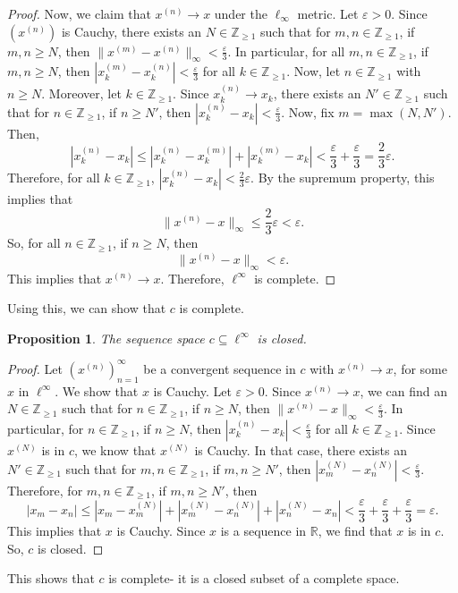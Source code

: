 \documentclass[a4paper, openany]{memoir}
\theoremstyle{definition}
\theoremstyle{plain}
\newtheorem{proposition}[definition]{Proposition}
\begin{document}
\begin{proof}
    \noindent Now, we claim that $x^{(n)} \to x$ under the $\ell_\infty$ metric. Let $\varepsilon > 0$. Since $(x^{(n)})$ is Cauchy, there exists an $N \in \mathbb{Z}_{\geq 1}$ such that for $m, n \in \mathbb{Z}_{\geq 1}$, if $m, n \geq N$, then $\lVert x^{(m)} - x^{(n)} \rVert_\infty < \frac{\varepsilon}{3}$. In particular, for all $m, n \in \mathbb{Z}_{\geq 1}$, if $m, n \geq N$, then $|x^{(m)}_k - x^{(n)}_k| < \frac{\varepsilon}{3}$ for all $k \in \mathbb{Z}_{\geq 1}$. Now, let $n \in \mathbb{Z}_{\geq 1}$ with $n \geq N$. Moreover, let $k \in \mathbb{Z}_{\geq 1}$. Since $x_k^{(n)} \to x_k$, there exists an $N' \in \mathbb{Z}_{\geq 1}$ such that for $n \in \mathbb{Z}_{\geq 1}$, if $n \geq N'$, then $|x_k^{(n)} - x_k| < \frac{\varepsilon}{3}$. Now, fix $m = \max(N, N')$. Then, 
    \[|x_k^{(n)} - x_k| \leq |x_k^{(n)} - x_k^{(m)}| + |x_k^{(m)} - x_k| < \frac{\varepsilon}{3} + \frac{\varepsilon}{3} = \frac{2}{3}\varepsilon.\]
    Therefore, for all $k \in \mathbb{Z}_{\geq 1}$, $|x_k^{(n)} - x_k| < \frac{2}{3}\varepsilon$. By the supremum property, this implies that
    \[\lVert x^{(n)} - x \rVert_\infty \leq \frac{2}{3}\varepsilon < \varepsilon.\]
    So, for all $n \in \mathbb{Z}_{\geq 1}$, if $n \geq N$, then
    \[\lVert x^{(n)} - x \rVert_\infty < \varepsilon.\]
    This implies that $x^{(n)} \to x$. Therefore, $\ell^\infty$ is complete.
\end{proof}
\noindent Using this, we can show that $c$ is complete.
\begin{proposition}
    The sequence space $c \subseteq \ell^\infty$ is closed.
\end{proposition}
\begin{proof}
    Let $(x^{(n)})_{n=1}^\infty$ be a convergent sequence in $c$ with $x^{(n)} \to x$, for some $x$ in $\ell^\infty$. We show that $x$ is Cauchy. Let $\varepsilon > 0$. Since $x^{(n)} \to x$, we can find an $N \in \mathbb{Z}_{\geq 1}$ such that for $n \in \mathbb{Z}_{\geq 1}$, if $n \geq N$, then $\lVert x^{(n)} - x \rVert_\infty < \frac{\varepsilon}{3}$. In particular, for $n \in \mathbb{Z}_{\geq 1}$, if $n \geq N$, then $|x^{(n)}_k - x_k| < \frac{\varepsilon}{3}$ for all $k \in \mathbb{Z}_{\geq 1}$. Since $x^{(N)}$ is in $c$, we know that $x^{(N)}$ is Cauchy. In that case, there exists an $N' \in \mathbb{Z}_{\geq 1}$ such that for $m, n \in \mathbb{Z}_{\geq 1}$, if $m, n \geq N'$, then $|x^{(N)}_m - x^{(N)}_n| < \frac{\varepsilon}{3}$. Therefore, for $m, n \in \mathbb{Z}_{\geq 1}$, if $m, n \geq N'$, then 
    \[|x_m - x_n| \leq |x_m - x_m^{(N)}| + |x_m^{(N)} - x_n^{(N)}| + |x_n^{(N)} - x_n| < \frac{\varepsilon}{3} + \frac{\varepsilon}{3} + \frac{\varepsilon}{3} = \varepsilon.\]
    This implies that $x$ is Cauchy. Since $x$ is a sequence in $\mathbb{R}$, we find that $x$ is in $c$. So, $c$ is closed.
\end{proof}
\noindent This shows that $c$ is complete- it is a closed subset of a complete space. 
\end{document}
